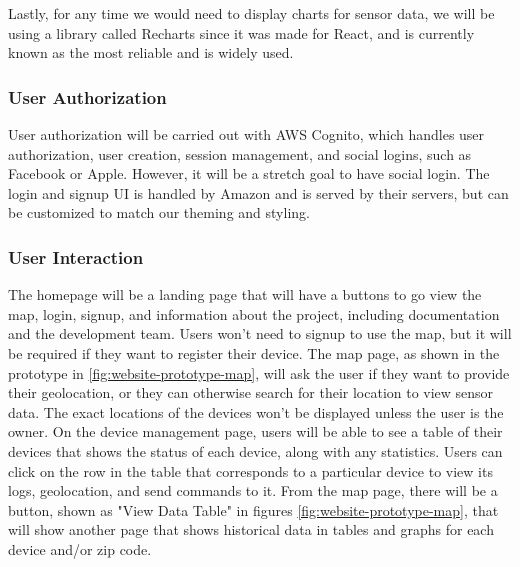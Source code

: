 Lastly, for any time we would need to display charts for sensor data, we will be using a library
called Recharts since it was made for React, and is currently known as the most reliable and is
widely used.


\subsubsection{User Authorization}
User authorization will be carried out with AWS Cognito, which handles user authorization, user
creation, session management, and social logins, such as Facebook or Apple. However, it will be
a stretch goal to have social login. The login and signup UI is handled by Amazon and is served by
their servers, but can be customized to match our theming and styling.

\subsubsection{User Interaction}
The homepage will be a landing page that will have a buttons to go view the map, login, signup, and
information about the project, including documentation and the development team. Users won't need to
signup to use the map, but it will be required if they want to register their device. The map page,
as shown in the prototype in \ref{fig:website-prototype-map}, will ask the user if they want to provide
their geolocation, or they can otherwise search for their location to view sensor data. The exact
locations of the devices won't be displayed unless the user is the owner. On the device management
page, users will be able to see a table of their devices that shows the status of each device, along
with any statistics. Users can click on the row in the table that corresponds to a particular
device to view its logs, geolocation, and send commands to it. From the map page, there will be
a button, shown as "View Data Table" in figures \ref{fig:website-prototype-map}, that will show another
page that shows historical data in tables and graphs for each device and/or zip code.
